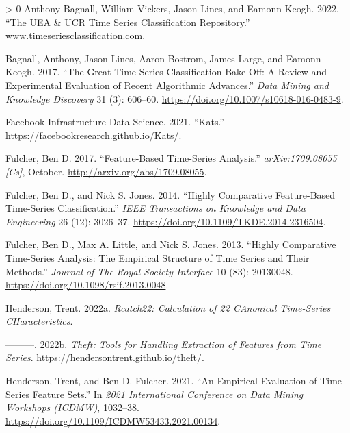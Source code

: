 \documentclass{article}
\newlength{\cslhangindent}
\newenvironment{CSLReferences}[3] %
 {%
  \setlength{\parindent}{0pt}
  \ifodd #1 \everypar{\setlength{\hangindent}{\cslhangindent}}\ignorespaces\fi
  \ifnum #2 > 0
  \setlength{\parskip}{#2\baselineskip}
  \fi
 }%
 {}
\begin{document}
\hypertarget{refs}{}
\begin{CSLReferences}{1}{0}
\leavevmode\hypertarget{ref-UEA_UCR_Repo}{}%
Anthony Bagnall, William Vickers, Jason Lines, and Eamonn Keogh. 2022.
{``The UEA \& UCR Time Series Classification Repository.''}
\href{https://www.timeseriesclassification.com}{www.timeseriesclassification.com}.

\leavevmode\hypertarget{ref-bagnallGreatTimeSeries2017}{}%
Bagnall, Anthony, Jason Lines, Aaron Bostrom, James Large, and Eamonn
Keogh. 2017. {``The Great Time Series Classification Bake Off: A Review
and Experimental Evaluation of Recent Algorithmic Advances.''}
\emph{Data Mining and Knowledge Discovery} 31 (3): 606--60.
\url{https://doi.org/10.1007/s10618-016-0483-9}.

\leavevmode\hypertarget{ref-Kats}{}%
Facebook Infrastructure Data Science. 2021. {``Kats.''}
\url{https://facebookresearch.github.io/Kats/}.

\leavevmode\hypertarget{ref-fulcherFeaturebasedTimeseriesAnalysis2017}{}%
Fulcher, Ben D. 2017. {``Feature-Based Time-Series Analysis.''}
\emph{arXiv:1709.08055 {[}Cs{]}}, October.
\url{http://arxiv.org/abs/1709.08055}.

\leavevmode\hypertarget{ref-fulcherHighlyComparativeFeaturebased2014}{}%
Fulcher, Ben D., and Nick S. Jones. 2014. {``Highly Comparative
Feature-Based Time-Series Classification.''} \emph{IEEE Transactions on
Knowledge and Data Engineering} 26 (12): 3026--37.
\url{https://doi.org/10.1109/TKDE.2014.2316504}.

\leavevmode\hypertarget{ref-fulcherHighlyComparativeTimeseries2013}{}%
Fulcher, Ben D., Max A. Little, and Nick S. Jones. 2013. {``Highly
Comparative Time-Series Analysis: The Empirical Structure of Time Series
and Their Methods.''} \emph{Journal of The Royal Society Interface} 10
(83): 20130048. \url{https://doi.org/10.1098/rsif.2013.0048}.

\leavevmode\hypertarget{ref-Rcatch22}{}%
Henderson, Trent. 2022a. \emph{Rcatch22: Calculation of 22 CAnonical
Time-Series CHaracteristics}.

\leavevmode\hypertarget{ref-theft}{}%
---------. 2022b. \emph{Theft: Tools for Handling Extraction of Features
from Time Series}. \url{https://hendersontrent.github.io/theft/}.

\leavevmode\hypertarget{ref-hendersonEmpiricalEvaluationTimeSeries2021}{}%
Henderson, Trent, and Ben D. Fulcher. 2021. {``An {Empirical Evaluation}
of {Time-Series Feature Sets}.''} In \emph{2021 {International
Conference} on {Data Mining Workshops} ({ICDMW})}, 1032--38.
\url{https://doi.org/10.1109/ICDMW53433.2021.00134}.


\end{CSLReferences}
\end{document}
